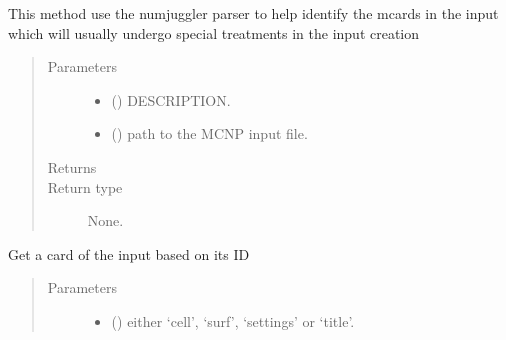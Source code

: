 \documentclass[letterpaper,10pt,english]{sphinxmanual}
\begin{document}
\begin{fulllineitems}
\begin{fulllineitems}
\end{fulllineitems}


\begin{fulllineitems}
\label{\detokenize{api/inputgeneration:inputfile.InputFile.from_text}}
This method use the numjuggler parser to help identify the mcards in
the input which will usually undergo special treatments in the input
creation
\begin{quote}\begin{description}
\item[{Parameters}] \leavevmode\begin{itemize}
\item {} 
 () \textendash{} DESCRIPTION.

\item {} 
 () \textendash{} path to the MCNP input file.

\end{itemize}

\item[{Returns}] \leavevmode


\item[{Return type}] \leavevmode
None.

\end{description}\end{quote}

\end{fulllineitems}


\begin{fulllineitems}
\label{\detokenize{api/inputgeneration:inputfile.InputFile.get_card_byID}}
Get a card of the input based on its ID
\begin{quote}\begin{description}
\item[{Parameters}] \leavevmode\begin{itemize}
\item {} 
 () \textendash{} either ‘cell’, ‘surf’, ‘settings’ or ‘title’.


\end{itemize}
\end{description}
\end{quote}
\end{fulllineitems}
\end{fulllineitems}
\end{document}
